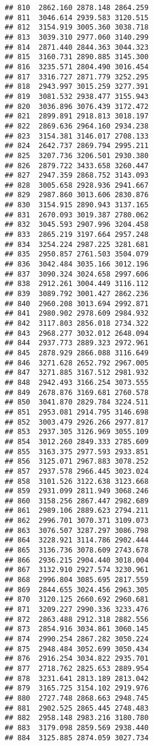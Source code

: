 \documentclass[
]{article}
\begin{document}
\begin{verbatim}
## 810  2862.160 2878.148 2864.259
## 811  3046.614 2939.583 3120.515
## 812  3154.919 3005.360 3038.718
## 813  3039.310 2977.060 3140.299
## 814  2871.440 2844.363 3044.323
## 815  3160.731 2890.885 3145.300
## 816  3235.571 2804.490 3016.454
## 817  3316.727 2871.779 3252.295
## 818  2943.997 3015.259 3277.391
## 819  3081.532 2938.477 3155.943
## 820  3036.896 3076.439 3172.472
## 821  2899.891 2918.813 3018.197
## 822  2869.636 2964.160 2934.238
## 823  3154.381 3146.017 2708.133
## 824  2642.737 2869.794 2995.211
## 825  3207.736 3206.501 2930.380
## 826  2879.722 3433.658 3260.447
## 827  2947.359 2868.752 3143.093
## 828  3005.658 2928.936 2941.667
## 829  2987.860 3013.606 2830.876
## 830  3154.915 2890.943 3137.165
## 831  2670.093 3019.387 2780.062
## 832  3045.593 2907.996 3204.458
## 833  2865.219 3197.664 2957.248
## 834  3254.224 2987.225 3281.681
## 835  2950.857 2761.503 3504.079
## 836  3042.484 3035.166 3012.196
## 837  3090.324 3024.658 2997.606
## 838  2912.261 3004.449 3116.112
## 839  3089.792 3001.427 2862.236
## 840  2960.208 3013.694 2992.871
## 841  2980.902 2978.609 2984.932
## 842  3117.803 2856.018 2734.322
## 843  2968.277 3032.012 2648.094
## 844  2937.773 2889.323 2972.961
## 845  2878.929 2866.088 3116.649
## 846  3271.628 2652.792 2967.005
## 847  3271.885 3167.512 2981.932
## 848  2942.493 3166.254 3073.555
## 849  2678.876 3169.681 2760.578
## 850  3041.870 2829.784 3224.511
## 851  2953.081 2914.795 3146.698
## 852  3003.479 2926.266 2977.817
## 853  2937.305 3126.969 3055.109
## 854  3012.260 2849.333 2785.609
## 855  3163.375 2977.593 2933.851
## 856  3125.071 2967.883 3078.252
## 857  2937.578 2966.445 3023.024
## 858  3101.526 3122.638 3123.668
## 859  2931.099 2811.949 3068.246
## 860  3158.256 2867.447 2982.689
## 861  2989.106 2889.623 2794.211
## 862  2996.701 3070.371 3109.073
## 863  3076.507 3287.297 3086.798
## 864  3228.921 3114.786 2902.444
## 865  3136.736 3078.609 2743.678
## 866  2936.215 2904.440 3018.004
## 867  3132.910 2927.574 3230.961
## 868  2996.804 3085.695 2817.559
## 869  2844.655 3024.456 2963.305
## 870  3120.125 2660.692 2960.681
## 871  3209.227 2990.336 3233.476
## 872  2863.488 2912.318 2882.556
## 873  2854.916 3034.861 3060.145
## 874  2990.254 2867.282 3050.224
## 875  2948.484 3052.699 3050.434
## 876  2916.254 3034.822 2935.701
## 877  2718.762 2825.653 2889.954
## 878  3231.641 2813.189 2813.042
## 879  3165.725 3154.102 2919.976
## 880  2727.748 2868.663 2948.745
## 881  2902.525 2865.445 2748.483
## 882  2958.148 2983.216 3180.780
## 883  3179.098 2859.569 2938.440
## 884  3125.885 2874.059 3027.734

\end{verbatim}
\end{document}
